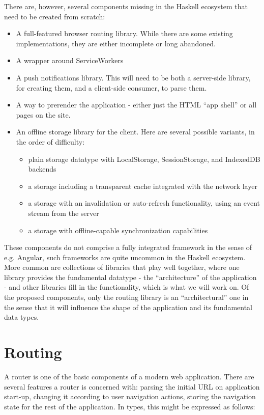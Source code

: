\documentclass[english,odsaz]{fitthesis}
\begin{document}
There are, however, several components missing in the Haskell ecosystem that
need to be created from scratch:
\begin{itemize}
\item A full-featured browser routing library. While there are some existing
implementations, they are either incomplete or long abandoned.
\item A wrapper around ServiceWorkers
\item A push notifications library. This will need to be both a server-side library,
for creating them, and a client-side consumer, to parse them.
\item A way to prerender the application - either just the HTML ``app shell'' or all
pages on the site.
\item An offline storage library for the client. Here are several possible variants,
in the order of difficulty:
\begin{itemize}
\item plain storage datatype with LocalStorage, SessionStorage, and IndexedDB backends
\item a storage including a transparent cache integrated with the network layer
\item a storage with an invalidation or auto-refresh functionality, using an event
stream from the server
\item a storage with offline-capable synchronization capabilities
\end{itemize}
\end{itemize}

These components do not comprise a fully integrated framework in the sense of
e.g. Angular, such frameworks are quite uncommon in the Haskell ecosystem. More
common are collections of libraries that play well together, where one library
provides the fundamental datatype - the ``architecture'' of the application - and
other libraries fill in the functionality, which is what we will work on. Of the
proposed components, only the routing library is an ``architectural'' one in the
sense that it will influence the shape of the application and its fundamental
data types.

\section{Routing}
\label{sec:orgec8dadc}
A router is one of the basic components of a modern web application. There are
several features a router is concerned with: parsing the initial URL on
application start-up, changing it according to user navigation actions, storing
the navigation state for the rest of the application. In types, this might be
expressed as follows:
\end{document}

